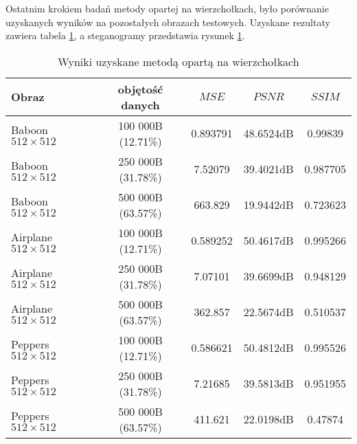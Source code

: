 {{{            %
            Ostatnim krokiem badań metody opartej na wierzchołkach, było porównanie uzyskanych wyników na pozostałych
            obrazach testowych. Uzyskane rezultaty zawiera tabela \ref{fig:exp-edge-img-comparison}, a steganogramy
            przedstawia rysunek \ref{fig:exp-edge-img-comparison}.

            \begin{table}
                \centering
                \caption{Wyniki uzyskane metodą opartą na wierzchołkach}
                \begin{tabular}{ |l|c|c c c| }
                    \hline
                    Obraz & objętość danych & $MSE$ & $PSNR$ & $SSIM$ \\
                    \hline
                    Baboon {\footnotesize $512 \times 512$}   & 100 000B (12.71\%) & 0.893791 & 48.6524dB & 0.99839 \\
                    Baboon {\footnotesize $512 \times 512$}   & 250 000B (31.78\%) & 7.52079 & 39.4021dB & 0.987705 \\
                    Baboon {\footnotesize $512 \times 512$}   & 500 000B (63.57\%) & 663.829 & 19.9442dB & 0.723623 \\
                    Airplane {\footnotesize $512 \times 512$} & 100 000B (12.71\%) & 0.589252 & 50.4617dB & 0.995266 \\
                    Airplane {\footnotesize $512 \times 512$} & 250 000B (31.78\%) & 7.07101 & 39.6699dB & 0.948129 \\
                    Airplane {\footnotesize $512 \times 512$} & 500 000B (63.57\%) & 362.857 & 22.5674dB & 0.510537 \\
                    Peppers {\footnotesize $512 \times 512$}  & 100 000B (12.71\%) & 0.586621 & 50.4812dB & 0.995526 \\
                    Peppers {\footnotesize $512 \times 512$}  & 250 000B (31.78\%) & 7.21685 & 39.5813dB & 0.951955 \\
                    Peppers {\footnotesize $512 \times 512$}  & 500 000B (63.57\%) & 411.621 & 22.0198dB & 0.47874 \\
                    \hline
                \end{tabular}
                \label{fig:exp-edge-img-comparison}
            \end{table}

}}}

